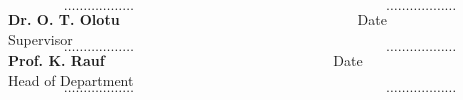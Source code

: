\documentclass[a4paper, 12pt]{report}
\begin{document}
$$$$%
$$\ldots\ldots\ldots\ldots\ldots\ldots\qquad\qquad\qquad\qquad\qquad\qquad\qquad\qquad\qquad \ldots\ldots\ldots\ldots\ldots\ldots$$
\textbf{Dr. O. T. Olotu}$\qquad\qquad\qquad\quad\qquad\qquad\qquad\qquad\qquad$Date\\
{\small Supervisor}
$$$$%
$$\ldots\ldots\ldots\ldots\ldots\ldots\qquad\qquad\qquad\qquad\qquad\qquad\qquad\qquad\qquad \ldots\ldots\ldots\ldots\ldots\ldots$$
\textbf{Prof. K. Rauf} $\qquad\qquad\qquad\qquad\qquad\qquad\qquad\qquad$Date\\
{\small Head of Department}
$$$$%
$$\ldots\ldots\ldots\ldots\ldots\ldots\qquad\qquad\qquad\qquad\qquad\qquad\qquad\qquad\qquad \ldots\ldots\ldots\ldots\ldots\ldots$$
\end{document}
